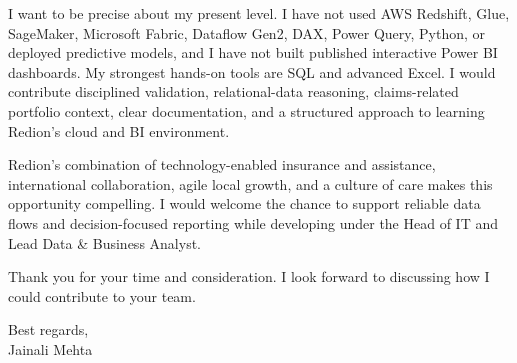 \documentclass[letterpaper,10pt]{article}
\begin{document}
I want to be precise about my present level. I have not used AWS Redshift, Glue, SageMaker, Microsoft Fabric, Dataflow Gen2, DAX, Power Query, Python, or deployed predictive models, and I have not built published interactive Power BI dashboards. My strongest hands-on tools are SQL and advanced Excel. I would contribute disciplined validation, relational-data reasoning, claims-related portfolio context, clear documentation, and a structured approach to learning Redion's cloud and BI environment.

Redion's combination of technology-enabled insurance and assistance, international collaboration, agile local growth, and a culture of care makes this opportunity compelling. I would welcome the chance to support reliable data flows and decision-focused reporting while developing under the Head of IT and Lead Data \& Business Analyst.

Thank you for your time and consideration. I look forward to discussing how I could contribute to your team.

Best regards,\\[8pt]
Jainali Mehta
\end{document}
